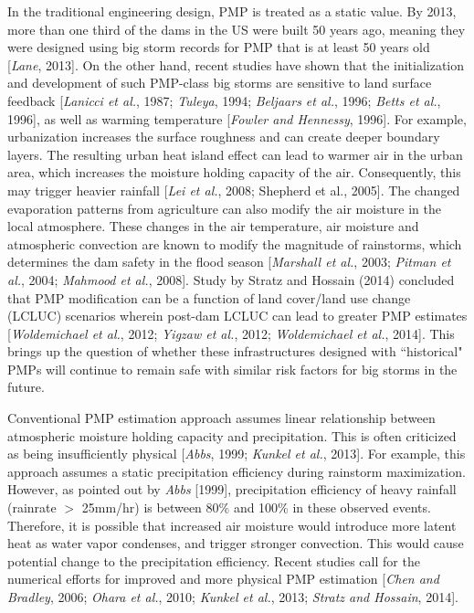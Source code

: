 In the traditional engineering design, PMP is treated as a static value. By 2013, more than one third of the dams in the US were built 50 years ago, meaning they were designed using big storm records for PMP that is at least 50 years old [\textit{Lane}, 2013]. On the other hand, recent studies have shown that the initialization and development of such PMP-class big storms are sensitive to land surface feedback [\textit{Lanicci et al.}, 1987; \textit{Tuleya}, 1994; \textit{Beljaars et al.}, 1996; \textit{Betts et al.}, 1996], as well as warming temperature [\textit{Fowler and Hennessy}, 1996]. For example, urbanization increases the surface roughness and can create deeper boundary layers. The resulting urban heat island effect can lead to warmer air in the urban area, which increases the moisture holding capacity of the air. Consequently, this may trigger heavier rainfall [\textit{Lei et al.}, 2008; Shepherd et al., 2005]. The changed evaporation patterns from agriculture can also modify the air moisture in the local atmosphere. These changes in the air temperature, air moisture and atmospheric convection are known to modify the magnitude of rainstorms, which determines the dam safety in the flood season [\textit{Marshall et al.}, 2003; \textit{Pitman et al.}, 2004; \textit{Mahmood et al.}, 2008]. Study by Stratz and Hossain (2014) concluded that PMP modification can be a function of land cover/land use change (LCLUC) scenarios wherein post-dam LCLUC can lead to greater PMP estimates [\textit{Woldemichael et al.}, 2012; \textit{Yigzaw et al.}, 2012; \textit{Woldemichael et al.}, 2014]. This brings up the question of whether these infrastructures designed with ``historical" PMPs will continue to remain safe with similar risk factors for big storms in the future.

Conventional PMP estimation approach assumes linear relationship between atmospheric moisture holding capacity and precipitation. This is often criticized as being insufficiently physical [\textit{Abbs}, 1999; \textit{Kunkel et al.}, 2013]. For example, this approach assumes a static precipitation efficiency during rainstorm maximization. However, as pointed out by \textit{Abbs} [1999], precipitation efficiency of heavy rainfall (rainrate $>$ 25mm/hr) is between 80\% and 100\% in these observed events. Therefore, it is possible that increased air moisture would introduce more latent heat as water vapor condenses, and trigger stronger convection. This would cause potential change to the precipitation efficiency. Recent studies call for the numerical efforts for improved and more physical PMP estimation [\textit{Chen and Bradley}, 2006; \textit{Ohara et al.}, 2010; \textit{Kunkel et al.}, 2013; \textit{Stratz and Hossain}, 2014].

